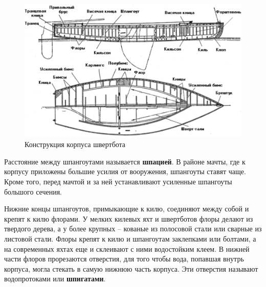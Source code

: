 \documentclass[a4paper, 12pt, twoside, final]{scrbook}
\begin{document}
\begin{figure}[htbp]
\begin{centering}
\includegraphics{pics/Korpus_shvertbota}
\par\end{centering}

\protect\caption{\label{fig:26}Конструкция корпуса швертбота}
\end{figure}


Расстояние между шпангоутами называется \textbf{шпацией}. В районе
мачты, где к корпусу приложены большие усилия от вооружения, шпангоуты
ставят чаще. Кроме того, перед мачтой и за ней устанавливают усиленные
шпангоуты большого сечения.

Нижние концы шпангоутов, примыкающие к килю, соединяют между собой
и крепят к килю флорами. У мелких килевых яхт и швертботов флоры делают
из твердого дерева, а у более крупных \--- кованые из полосовой стали
или сварные из листовой стали. Флоры крепят к килю и шпангоутам заклепками
или болтами, а на современных яхтах еще и склеивают с ними водостойким
клеем. В нижней части флоров прорезаются отверстия, для того чтобы
вода, попавшая внутрь корпуса, могла стекать в самую нижнюю часть
корпуса. Эти отверстия называют водопротоками или \textbf{шпигатами}.
\end{document}
